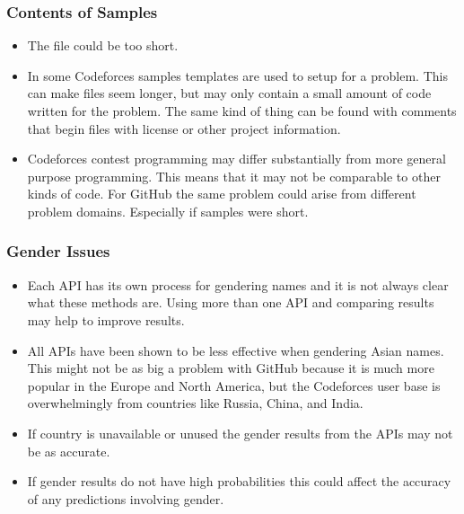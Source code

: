 \documentclass[12pt]{article}
\begin{document}
\subsubsection*{Contents of Samples}
\begin{itemize}
    \item The file could be too short.
    \item In some Codeforces samples templates are used to setup for a problem. This can make files seem longer, but may only contain a small amount of code written for the problem. The same kind of thing can be found with comments that begin files with license or other project information.
    \item Codeforces contest programming may differ substantially from more general purpose programming. This means that it may not be comparable to other kinds of code. For GitHub the same problem could arise from different problem domains. Especially if samples were short.
\end{itemize}

\subsubsection*{Gender Issues}
\begin{itemize}
    \item Each API has its own process for gendering names and it is not always clear what these methods are. Using more than one API and comparing results may help to improve results.
    \item All APIs have been shown to be less effective when gendering Asian names. This might not be as big a problem with GitHub because it is much more popular in the Europe and North America, but the Codeforces user base is overwhelmingly from countries like Russia, China, and India.
    \item If country is unavailable or unused the gender results from the APIs may not be as accurate.
    \item If gender results do not have high probabilities this could affect the accuracy of any predictions involving gender.
\end{itemize}
\end{document}
